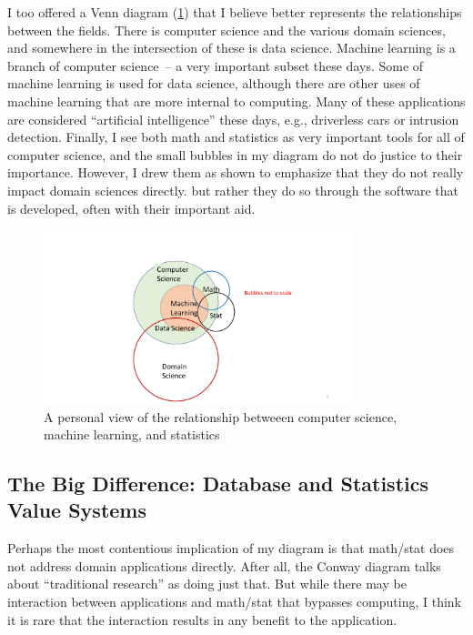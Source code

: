 \documentclass[11pt]{article}
\begin{document}
I too offered a Venn diagram (\ref{myvenn-fig}) that I believe better represents the relationships between the fields.  There is computer science and the various domain sciences, and somewhere in the intersection of these is data science.  Machine learning is a branch of computer science~-- a very important subset these days.  Some of machine learning is used for data science, although there are other uses of machine learning that are more internal to computing.  Many of these applications are considered ``artificial intelligence'' these days, e.g., driverless cars or intrusion detection.  Finally, I see both math and statistics as very important tools for all of computer science, and the small bubbles in my diagram do not do justice to their importance.  However, I drew them as shown to emphasize that they do not really impact domain sciences directly.  but rather they do so through the software that is developed, often with their important aid.

\begin{figure}[h]
\centerline{\includegraphics[width=0.8\textwidth]{myvenn.pdf}}
\caption{A personal view of the relationship betweeen computer science, machine learning, and statistics}
\label{myvenn-fig}
\end{figure}

\subsection{The Big Difference: Database and Statistics Value Systems}

Perhaps the most contentious implication of my diagram is that math/stat does not address domain applications directly.  After all, the Conway diagram talks about ``traditional research'' as doing just that.  But while there may be interaction between applications and math/stat that bypasses computing, I think it is rare that the interaction results in any benefit to the application.
\end{document}
